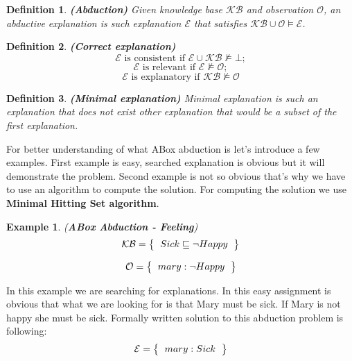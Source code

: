 \documentclass[12pt,a4paper]{article}
\newtheorem{definition}{Definition}[subsection]
\newtheorem{example}{Example}[subsection]
\begin{document}
\begin{definition}{\textbf{(Abduction)}} 
	Given knowledge base $\mathcal{KB}$ and observation $\mathcal{O}$, an abductive explanation is such explanation $\mathcal{E}$ that satisfies $\mathcal{KB} \cup \mathcal{O} \models \mathcal{E}$.
\end{definition}

\begin{definition}{\textbf{(Correct explanation)}}
	\[ \mathcal{E} \text{ is consistent if } \mathcal{E} \cup \mathcal{KB} \not \models \mathcal{\bot}; \] 
	\[ \mathcal{E} \text{ is relevant if } \mathcal{E} \not \models \mathcal{O}; \]
	\[ \mathcal{E} \text{ is explanatory if } \mathcal{KB} \not \models \mathcal{O} \]
\end{definition}

\begin{definition}{\textbf{(Minimal explanation)}}
	Minimal explanation is such an explanation that does not exist other explanation that would be a subset of the first explanation.
\end{definition}

For better understanding of what ABox abduction is let's introduce a few examples. First example is easy, searched explanation is obvious but it will demonstrate the problem. Second example is not so obvious that's why we have to use an algorithm to compute the solution. For computing the solution we use \textbf{Minimal Hitting Set algorithm}.

\begin{example}{(\textbf{ABox Abduction - Feeling})}
	\[ 
	\mathcal{KB} = \left\{
	\begin{tabular}{l c}
	$Sick \sqsubseteq \neg Happy$
	\end{tabular}
	\right \}
	\]
	
	\[ 
	\mathcal{O} = \left\{
	\begin{tabular}{l c}
	$mary : \neg Happy$
	\end{tabular}
	\right \}
	\]								
\end{example}

In this example we are searching for explanations. In this easy assignment is obvious that what we are looking for is that Mary must be sick. If Mary is not happy she must be sick. Formally written solution to this abduction problem is following:
\[ 
\mathcal{E} = \left\{
\begin{tabular}{l c}
$mary : Sick$
\end{tabular}
\right \}
\]
\end{document}
